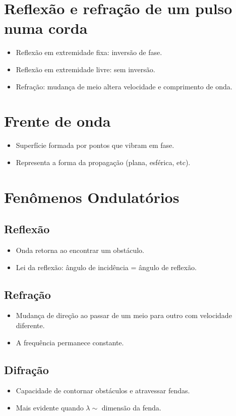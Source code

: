\documentclass[a4paper,12pt]{article}
\begin{document}
\begin{multicols}{2}
\section{Reflexão e refração de um pulso numa corda}
\begin{itemize}
    \item Reflexão em extremidade fixa: inversão de fase.
    \item Reflexão em extremidade livre: sem inversão.
    \item Refração: mudança de meio altera velocidade e comprimento de onda.
\end{itemize}

\section{Frente de onda}
\begin{itemize}
    \item Superfície formada por pontos que vibram em fase.
    \item Representa a forma da propagação (plana, esférica, etc).
\end{itemize}

\section{Fenômenos Ondulatórios}
\subsection{Reflexão}
\begin{itemize}
    \item Onda retorna ao encontrar um obstáculo.
    \item Lei da reflexão: ângulo de incidência = ângulo de reflexão.
\end{itemize}

\subsection{Refração}
\begin{itemize}
    \item Mudança de direção ao passar de um meio para outro com velocidade diferente.
    \item A frequência permanece constante.
\end{itemize}

\subsection{Difração}
\begin{itemize}
    \item Capacidade de contornar obstáculos e atravessar fendas.
    \item Mais evidente quando $\lambda \sim$ dimensão da fenda.
\end{itemize}


\end{multicols}
\end{document}
